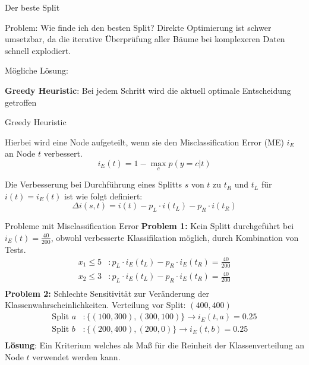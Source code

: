 \documentclass{beamer}
\begin{document}
\begin{frame}{Der beste Split}
\begin{alertblock}{Problem: Wie finde ich den besten Split?}
	Direkte Optimierung ist schwer umsetzbar, da die iterative Überprüfung aller Bäume bei komplexeren Daten schnell explodiert.
	\\\vspace{0.5cm}
	
	
	Mögliche Lösung:\\ \vspace{0.5cm}
	
	
	\textbf{Greedy Heuristic}: Bei jedem Schritt wird die aktuell optimale Entscheidung getroffen

\end{alertblock}

\end{frame}


\begin{frame}{Greedy Heuristic}

Hierbei wird eine Node aufgeteilt, wenn sie den Misclassification Error (ME) $i_E$ an Node $t$ verbessert.
   \[
   	i_E (t) = 1 - \max_c p(y = c | t)
   \]

Die Verbesserung bei Durchführung eines Splitts $s$ von $t$ zu $t_R$ und $t_L$ für $i(t) = i_E (t) $ ist wie folgt definiert: 
\[
	\Delta i(s, t) = i(t) - p_L \cdot i(t_L) - p_R \cdot i(t_R)
\]	

\end{frame}
\begin{frame}{Probleme mit Misclassification Error}
\textbf{Problem 1:} Kein Splitt durchgeführt bei $i_E (t) = \frac{40}{200}$, obwohl verbesserte Klassifikation möglich, durch Kombination von Tests.
 \begin{align*}
 	x_1 \leq 5&: p_L \cdot i_E (t_L) - p_R \cdot i_E (t_R) = \frac{40}{200} \\
	x_2 \leq 3&: p_L \cdot i_E (t_L) - p_R \cdot i_E (t_R) = \frac{40}{200} \\
 \end{align*}
\textbf{Problem 2:}
Schlechte Sensitivität zur Veränderung der Klassenwahrscheinlichkeiten.
Verteilung vor Split: $(400, 400)$
 \begin{align*}
 	\text{Split } a &: \{(100,300), (300,100)\} \rightarrow i_E (t, a) = 0.25 \\
	\text{Split } b &: \{(200,400), (200,0)\} \rightarrow i_E (t, b) = 0.25 \\
 \end{align*}
 \textbf{Lösung}: Ein Kriterium welches als Maß für die Reinheit der Klassenverteilung an Node $t$ verwendet werden kann.
\end{frame}
\end{document}
